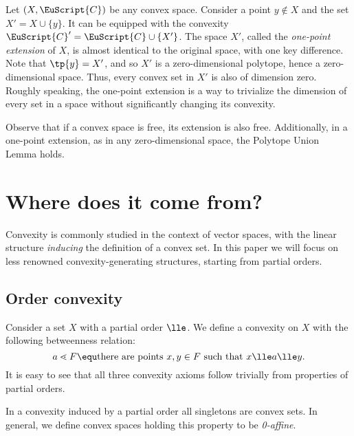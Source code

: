 \documentclass[12pt, a4paper]{article}
\newcommand{\C}{\EuScript{C}}
\newcommand{\btw}{\lessdot}
\begin{document}
\begin{definition}\label{def-0-dim-ext}
    Let \((X, \C)\) be any convex space. Consider a point \(y \nin X\) and the set \(X' = X \cup \{y\}\). It can be equipped with the convexity \(\C' = \C \cup \{X'\}\). The space \(X'\), called the \textit{one-point extension} of \(X\), is almost identical to the original space, with one key difference. Note that \(\tp{y} = X'\), and so \(X'\) is a zero-dimensional polytope, hence a zero-dimensional space. Thus, every convex set in \(X'\) is also of dimension zero. Roughly speaking, the one-point extension is a way to trivialize the dimension of every set in a space without significantly changing its convexity.
\end{definition}

\begin{remark}
    Observe that if a convex space is free, its extension is also free. Additionally, in a one-point extension, as in any zero-dimensional space, the Polytope Union Lemma holds.
\end{remark}


\section{Where does it come from?}

Convexity is commonly studied in the context of vector spaces, with the linear structure \textit{inducing} the definition of a convex set. In this paper we will focus on less renowned convexity-generating structures, starting from partial orders.

\subsection{Order convexity}\label{order}

\begin{definition}\label{def-ord-conv}
    Consider a set \(X\) with a partial order \(\lle\). We define a convexity on \(X\) with the following betweenness relation: \[a \btw F \equ \mbox{there are points } x, y \in F \mbox{ such that } x \lle a \lle y.\] It is easy to see that all three convexity axioms follow trivially from properties of partial orders.
\end{definition}

\begin{observation}\label{ord-singl-obs}
    In a convexity induced by a partial order all singletons are convex sets. In general, we define convex spaces holding this property to be \textit{0-affine}.
\end{observation}
\end{document}
